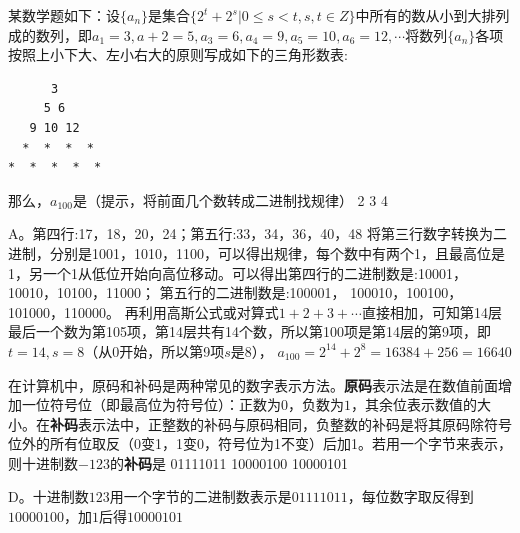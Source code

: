 \begin{groups}
\begin{questions}[rp]
\question
{}某数学题如下：设$\{a_n\}$是集合$\{2^t+2^s | 0 \le s<t, s,t\in Z\}$中所有的数从小到大排列成的数列，即$a_1=3, a+2=5, a_3=6, a_4=9, a_5=10, a_6=12, \cdots$将数列$\{a_n\}$各项按照上小下大、左小右大的原则写成如下的三角形数表:
\begin{lstlisting}
      3
     5 6
   9 10 12
  *  *  *  *
*  *  *  *  *
\end{lstlisting}
那么，$a_{100}$是（提示，将前面几个数转成二进制找规律）
{2}
{3}
{4}
\begin{solution}
A。第四行:17，18，20，24；第五行:33，34，36，40，48
将第三行数字转换为二进制，分别是1001，1010，1100，可以得出规律，每个数中有两个1，且最高位是1，另一个1从低位开始向高位移动。可以得出第四行的二进制数是:10001， 10010，10100，11000；
第五行的二进制数是:100001， 100010，100100，101000，110000。
再利用高斯公式或对算式$1+2+3+\cdots$直接相加，可知第14层最后一个数为第105项，第14层共有14个数，所以第100项是第14层的第9项，即$t=14,s=8$（从0开始，所以第9项$s$是8）， $a_{100} = 2^{14}+2^8=16384+256= 16640$
\end{solution}

\question
{}在计算机中，原码和补码是两种常见的数字表示方法。\textbf{原码}表示法是在数值前面增加一位符号位（即最高位为符号位）：正数为$0$，负数为$1$，其余位表示数值的大小。在\textbf{补码}表示法中，正整数的补码与原码相同，负整数的补码是将其原码除符号位外的所有位取反（0变1，1变0，符号位为1不变）后加1。若用一个字节来表示，则十进制数$-123$的\textbf{补码}是
{01111011}
{10000100}
{10000101}
\begin{solution}
D。十进制数$123$用一个字节的二进制数表示是$01111011$，每位数字取反得到$10000100$，加$1$后得$10000101$
\end{solution}






\end{questions}
\end{groups}
